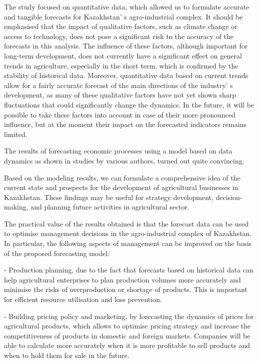 \begin{multicols}{2}

The study focused on quantitative data, which allowed us to formulate
accurate and tangible forecasts for Kazakhstan' s
agro-industrial complex. It should be emphasised that the impact of
qualitative factors, such as climate change or access to technology,
does not pose a significant risk to the accuracy of the forecasts in
this analysis. The influence of these factors, although important for
long-term development, does not currently have a significant effect on
general trends in agriculture, especially in the short term, which is
confirmed by the stability of historical data. Moreover, quantitative
data based on current trends allow for a fairly accurate forecast of the
main directions of the industry' s development, as many
of these qualitative factors have not yet shown sharp fluctuations that
could significantly change the dynamics. In the future, it will be
possible to take these factors into account in case of their more
pronounced influence, but at the moment their impact on the forecasted
indicators remains limited.

The results of forecasting economic processes using a model based on
data dynamics as shown in studies by various authors, turned out quite
convincing.

Based on the modeling results, we can formulate a comprehensive idea of
the current state and prospects for the development of agricultural
businesses in Kazakhstan. These findings may be useful for strategy
development, decision-making, and planning future activities in
agricultural sector.

The practical value of the results obtained is that the forecast data
can be used to optimise management decisions in the agro-industrial
complex of Kazakhstan. In particular, the following aspects of
management can be improved on the basis of the proposed forecasting
model:

- Production planning, due to the fact that forecasts based on
historical data can help agricultural enterprises to plan production
volumes more accurately and minimise the risks of overproduction or
shortage of products. This is important for efficient resource
utilisation and loss prevention.

- Building pricing policy and marketing, by forecasting the dynamics of
prices for agricultural products, which allows to optimise pricing
strategy and increase the competitiveness of products in domestic and
foreign markets. Companies will be able to calculate more accurately
when it is more profitable to sell products and when to hold them for
sale in the future.


\end{multicols}
